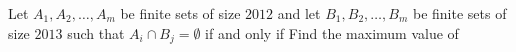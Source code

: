 Let $A_1,A_2,\ldots,A_m$ be finite sets of size $2012$ and let $B_1,B_2,\ldots,B_m$ be finite sets of size $2013$ such that $A_i\cap B_j=\emptyset$ if and only if   Find the maximum value of 